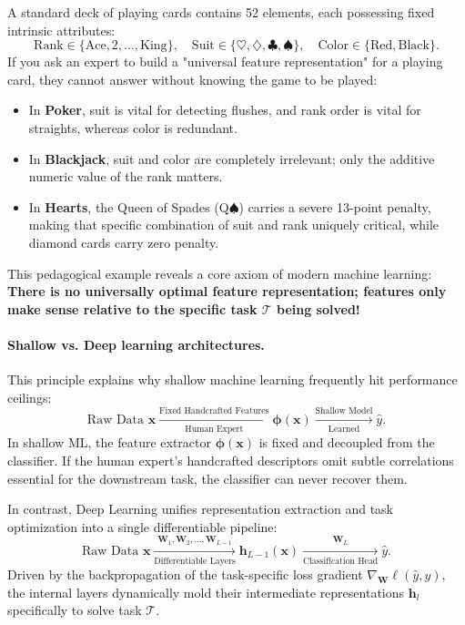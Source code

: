 A standard deck of playing cards contains 52 elements, each possessing fixed intrinsic attributes:
\begin{equation}
\text{Rank} \in \{\text{Ace}, 2, \dots, \text{King}\}, \quad \text{Suit} \in \{\heartsuit, \diamondsuit, \clubsuit, \spadesuit\}, \quad \text{Color} \in \{\text{Red}, \text{Black}\}.
\end{equation}
If you ask an expert to build a "universal feature representation" for a playing card, they cannot answer without knowing the game to be played:
\begin{itemize}[noitemsep]
  \item In \textbf{Poker}, suit is vital for detecting flushes, and rank order is vital for straights, whereas color is redundant.
  \item In \textbf{Blackjack}, suit and color are completely irrelevant; only the additive numeric value of the rank matters.
  \item In \textbf{Hearts}, the Queen of Spades ($\text{Q}\spadesuit$) carries a severe 13-point penalty, making that specific combination of suit and rank uniquely critical, while diamond cards carry zero penalty.
\end{itemize}
This pedagogical example reveals a core axiom of modern machine learning: \textbf{There is no universally optimal feature representation; features only make sense relative to the specific task $\mathcal{T}$ being solved!}

\paragraph{Shallow vs. Deep learning architectures.}
This principle explains why shallow machine learning frequently hit performance ceilings:
\begin{equation}
\text{Raw Data } \mathbf{x} \xrightarrow[\text{Human Expert}]{\text{Fixed Handcrafted Features}} \boldsymbol{\phi}(\mathbf{x}) \xrightarrow[\text{Learned}]{\text{Shallow Model}} \hat{y}.
\end{equation}
In shallow ML, the feature extractor $\boldsymbol{\phi}(\mathbf{x})$ is fixed and decoupled from the classifier. If the human expert's handcrafted descriptors omit subtle correlations essential for the downstream task, the classifier can never recover them.

In contrast, Deep Learning unifies representation extraction and task optimization into a single differentiable pipeline:
\begin{equation}
\text{Raw Data } \mathbf{x} \xrightarrow[\text{Differentiable Layers}]{\mathbf{W}_1, \mathbf{W}_2, \dots, \mathbf{W}_{L-1}} \mathbf{h}_{L-1}(\mathbf{x}) \xrightarrow[\text{Classification Head}]{\mathbf{W}_L} \hat{y}.
\end{equation}
Driven by the backpropagation of the task-specific loss gradient $\nabla_{\mathbf{W}} \ell(\hat{y}, y)$, the internal layers dynamically mold their intermediate representations $\mathbf{h}_l$ specifically to solve task $\mathcal{T}$.

